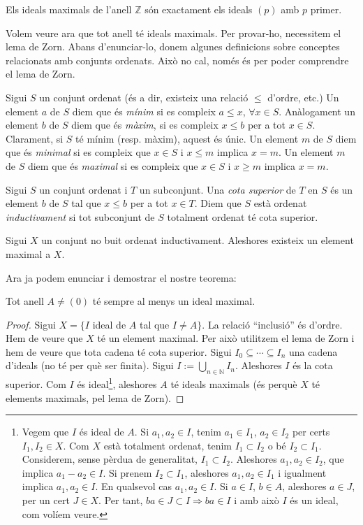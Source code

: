 \documentclass[../main.tex]{subfiles}
\begin{document}
\begin{ej}
Els ideals maximals de l'anell $\mathbb{Z}$ són exactament els ideals $(p)$ amb $p$ primer.
\end{ej}

Volem veure ara que tot anell té ideals maximals. Per provar-ho, necessitem el lema de Zorn. Abans d'enunciar-lo, donem algunes definicions sobre conceptes relacionats amb conjunts ordenats. Això no cal, només és per poder comprendre el lema de Zorn.

Sigui $S$ un conjunt ordenat (és a dir, existeix una relació $\leq$ d'ordre, etc.) Un element $a$ de $S$ diem que és \textit{mínim} si es compleix $a\leq x$, $\forall x\in S$. Anàlogament un element $b$ de $S$ diem que és \textit{màxim}, si es compleix $x\leq b$ per a tot $x\in S$. Clarament, si $S$ té mínim (resp. màxim), aquest és únic. Un element $m$ de $S$ diem que és \textit{minimal} si es compleix que $x\in S$ i $x\leq m$ implica $x=m$. Un element $m$ de $S$ diem que és \textit{maximal} si es compleix que $x\in S$ i $x\geq m$ implica $x=m$.

Sigui $S$ un conjunt ordenat i $T$ un subconjunt. Una \textit{cota superior} de $T$ en $S$ és un element $b$ de $S$ tal que $x\leq b$ per a tot $x\in T$. Diem que $S$ està ordenat \textit{inductivament} si tot subconjunt de $S$ totalment ordenat té cota superior.

\begin{lema}
\label{lema:lemadezorn} Sigui $X$ un conjunt no buit ordenat inductivament. Aleshores existeix un element maximal a $X$.
\end{lema}

Ara ja podem enunciar i demostrar el nostre teorema:
\begin{ter}
\label{ter:totanellteunmaximal} Tot anell $A\not=(0)$ té sempre al menys un ideal maximal.
\end{ter}
\begin{proof}
Sigui $X = \{I$ ideal de $A$ tal que $I\not=A\}$. La relació ``inclusió'' és d'ordre. Hem de veure que $X$ té un element maximal. Per això utilitzem el lema de Zorn i hem de veure que tota cadena té cota superior. Sigui $I_0\subseteq\cdots\subseteq I_n$ una cadena d'ideals (no té per què ser finita). Sigui $I:=\bigcup_{n\in\mathbb{N}} I_n$. Aleshores $I$ és la cota superior. Com $I$ és ideal\footnote{Vegem que $I$ és ideal de $A$. Si $a_1,a_2\in I$, tenim $a_1\in I_1$, $a_2\in I_2$ per certs $I_1,I_2\in X$. Com $X$ està totalment ordenat, tenim $I_1\subset I_2$ o bé $I_2\subset I_1$. Considerem, sense pèrdua de generalitat, $I_1\subset I_2$. Aleshores $a_1,a_2\in I_2$, que implica $a_1-a_2\in I$. Si prenem $I_2\subset I_1$, aleshores $a_1,a_2\in I_1$ i igualment implica $a_1,a_2\in I$. En qualsevol cas $a_1,a_2\in I$. Si $a\in I$, $b\in A$, aleshores $a\in J$, per un cert $J\in X$. Per tant, $ba\in J\subset I\Rightarrow ba\in I$ i amb això $I$ és un ideal, com volíem veure.}, aleshores $A$ té ideals maximals (és perquè $X$ té elements maximals, pel lema de Zorn).
\end{proof}
\end{document}

